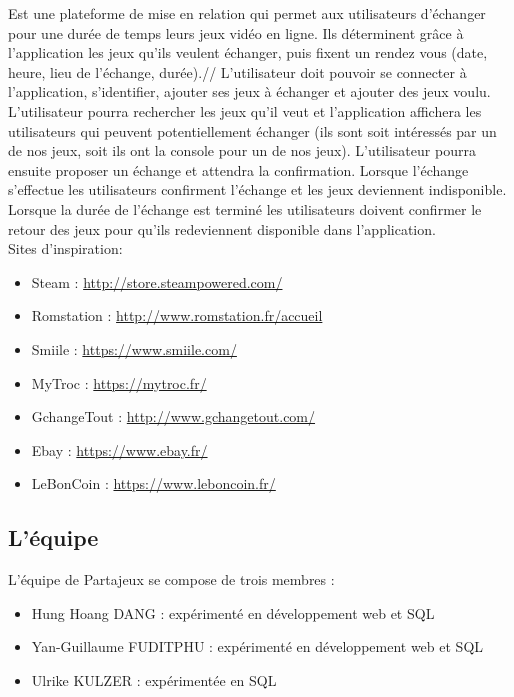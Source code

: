 \documentclass[a4paper,12pt,abstracton,titlepage]{scrartcl}
\begin{document}
Est une plateforme de mise en relation qui permet aux utilisateurs d'échanger
pour une durée de temps leurs jeux vidéo en ligne. Ils déterminent grâce à
l'application les jeux qu'ils veulent échanger, puis fixent un rendez vous (date, heure, lieu de l'échange, durée).//
L'utilisateur doit pouvoir se connecter à l'application, s'identifier, ajouter ses jeux à échanger et ajouter des jeux voulu. L'utilisateur pourra rechercher les jeux qu'il veut et l'application affichera les utilisateurs qui peuvent potentiellement échanger (ils sont soit intéressés par un de nos jeux, soit ils ont la console pour un de nos jeux). L'utilisateur pourra ensuite proposer un échange et attendra la confirmation. Lorsque l'échange s'effectue les utilisateurs confirment l'échange et les jeux deviennent indisponible. Lorsque la durée de l'échange est terminé les utilisateurs doivent confirmer le retour des jeux pour qu'ils redeviennent disponible dans l'application.\\

Sites d'inspiration:\\
\begin{itemize}
\item Steam : 
\url{http://store.steampowered.com/}\\
\item Romstation : 
\url{http://www.romstation.fr/accueil}\\
\item Smiile : 
\url{https://www.smiile.com/}\\
\item MyTroc : 
\url{https://mytroc.fr/}\\
\item GchangeTout : 
\url{http://www.gchangetout.com/}\\
\item Ebay : 
\url{https://www.ebay.fr/}\\
\item LeBonCoin : 
\url{https://www.leboncoin.fr/}\\
\end{itemize}

\subsection{L'équipe}
L'équipe de Partajeux se compose de trois membres :\\
\begin{itemize}
\item Hung Hoang DANG : expérimenté en développement web et SQL\\
\item Yan-Guillaume FUDITPHU : expérimenté en développement web et SQL\\
\item Ulrike KULZER : expérimentée en SQL\\
\end{itemize}
\end{document}
